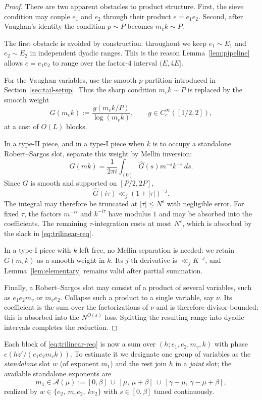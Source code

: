 \documentclass[11pt]{article}
\theoremstyle{remark}
\newcommand{\N}{N}
\newcommand{\eof}[1]{e\!\left(#1\right)}
\begin{document}
\begin{proof}
There are two apparent obstacles to product structure. First, the sieve
condition may couple $e_1$ and $e_2$ through their product $e=e_1e_2$.
Second, after Vaughan's identity the condition $p\sim P$ becomes
$m_vk\sim P$.

The first obstacle is avoided by construction: throughout we keep
$e_1\sim E_1$ and $e_2\sim E_2$ in independent dyadic ranges. This is the
reason Lemma~\ref{lem:pipeline} allows $e=e_1e_2$ to range over the
factor-$4$ interval $(E,4E]$.

For the Vaughan variables, use the smooth $p$-partition introduced in
Section~\ref{sec:tail-setup}. Thus the sharp condition $m_vk\sim P$ is
replaced by the smooth weight
\[
G(m_vk):=\frac{g(m_vk/P)}{\log(m_vk)},
\qquad g\in C_c^\infty([1/2,2]),
\]
at a cost of $O(L)$ blocks.

In a type-II piece, and in a type-I piece when $k$ is to occupy a
standalone Robert--Sargos slot, separate this weight by Mellin inversion:
\[
G(mk)=\frac{1}{2\pi i}\int_{(0)}
   \widehat G(s)m^{-s}k^{-s}\,ds .
\]
Since $G$ is smooth and supported on $[P/2,2P]$,
\[
\widehat G(i\tau)\ll_j (1+|\tau|)^{-j}.
\]
The integral may therefore be truncated at $|\tau|\le \N^\varepsilon$
with negligible error. For fixed $\tau$, the factors $m^{-i\tau}$ and
$k^{-i\tau}$ have modulus $1$ and may be absorbed into the coefficients.
The remaining $\tau$-integration costs at most $\N^\varepsilon$, which is
absorbed by the slack in \eqref{eq:trilinear-req}.

In a type-I piece with $k$ left free, no Mellin separation is needed:
we retain $G(m_vk)$ as a smooth weight in $k$. Its $j$-th derivative is
$\ll_j K^{-j}$, and Lemma~\ref{lem:elementary} remains valid after partial
summation.

Finally, a Robert--Sargos slot may consist of a product of several variables,
such as $e_1e_2m_v$ or $m_ve_2$. Collapse such a product to a single variable,
say $\nu$. Its coefficient is the sum over the factorizations of $\nu$ and
is therefore divisor-bounded; this is absorbed into the
$\N^{O(\varepsilon)}$ loss. Splitting the resulting range into dyadic
intervals completes the reduction.
\end{proof}

Each block of \eqref{eq:trilinear-req} is now a sum over
$(h;e_1,e_2,m_v,k)$ with phase $\eof{hz'/(e_1e_2m_vk)}$. To estimate it we designate
one group of variables as the \emph{standalone} slot $w$ (of exponent $m_1$) and the
rest join $h$ in a \emph{joint} slot; the available standalone exponents are
\begin{equation}\label{eq:available}
m_1\in \mathcal{A}(\mu):=[0,\beta]\ \cup\ [\mu,\,\mu+\beta]\ \cup\ [\gamma-\mu,\,\gamma-\mu+\beta],
\end{equation}
realized by $w\in\{e_2,\ m_ve_2,\ k e_2\}$ with $s\in[0,\beta]$ tuned continuously.
\end{document}
